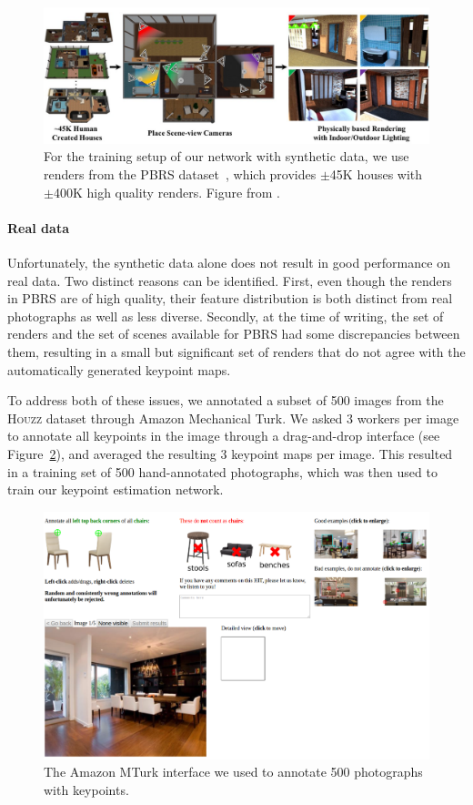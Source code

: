 \documentclass[10pt,twocolumn,letterpaper]{article}
\begin{document}
\begin{figure}
    \includegraphics[width=\linewidth]{figures/pbrs/pbrs}
    \caption[PBRS dataset]{For the training setup of our network with synthetic data, we use renders from the PBRS dataset~\cite{Zhang:2017:CVPR}, which provides $\pm$45K houses with $\pm$400K high quality renders. Figure from \cite{Zhang:2017:CVPR}.}
    \label{fig:ch4:pbrs}
\end{figure}

\paragraph{Real data}
Unfortunately, the synthetic data alone does not result in good performance on
real data. Two distinct reasons can be identified. First, even though the renders
in \textsc{PBRS} are of high quality, their feature distribution is both
distinct from real photographs as well as less diverse. Secondly, at the time
of writing, the set of renders and the set of scenes available for
\textsc{PBRS} had some discrepancies between them, resulting in a small but
significant set of renders that do not agree with the automatically generated
keypoint maps.

To address both of these issues, we annotated a subset of 500 images from the
\textsc{Houzz} dataset through Amazon Mechanical Turk. We asked 3 workers per
image to annotate all keypoints in the image through a drag-and-drop interface
(see Figure~\ref{fig:ch4:amt}), and averaged the resulting 3 keypoint maps per
image.  This resulted in a training set of 500 hand-annotated photographs, which
was then used to train our keypoint estimation network.

\begin{figure}
    \includegraphics[width=\linewidth]{figures/amt/amt}
    \caption[MTurk interface]{The Amazon MTurk interface we used to annotate 500 photographs with keypoints.}
    \label{fig:ch4:amt}
\end{figure}
\end{document}
